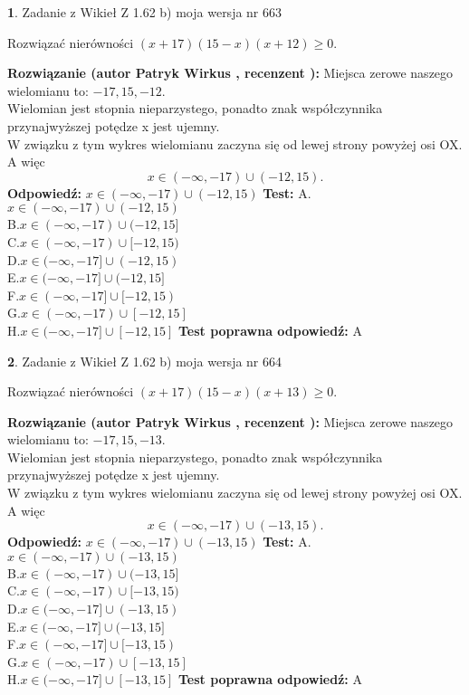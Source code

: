\documentclass[12pt, a4paper]{article}
\theoremstyle{definition} %
\newtheorem{zad}{}
\newcommand{\zadStart}[1]{\begin{zad}#1\newline}
\newcommand{\zadStop}{\end{zad}}
\newcommand{\rozwStart}[2]{\noindent \textbf{Rozwiązanie (autor #1 , recenzent #2): }\newline}
\newcommand{\rozwStop}{\newline}
\newcommand{\odpStart}{\noindent \textbf{Odpowiedź:}\newline}
\newcommand{\odpStop}{\newline}
\newcommand{\testStart}{\noindent \textbf{Test:}\newline}
\newcommand{\testStop}{\newline}
\newcommand{\kluczStart}{\noindent \textbf{Test poprawna odpowiedź:}\newline}
\newcommand{\kluczStop}{\newline}
\begin{document}
\zadStart{Zadanie z Wikieł Z 1.62 b) moja wersja nr 663}

Rozwiązać nierówności $(x+17)(15-x)(x+12)\ge0$.
\zadStop
\rozwStart{Patryk Wirkus}{}
Miejsca zerowe naszego wielomianu to: $-17, 15, -12$.\\
Wielomian jest stopnia nieparzystego, ponadto znak współczynnika przy\linebreak najwyższej potędze x jest ujemny.\\ W związku z tym wykres wielomianu zaczyna się od lewej strony powyżej osi OX. A więc $$x \in (-\infty,-17) \cup (-12,15).$$
\rozwStop
\odpStart
$x \in (-\infty,-17) \cup (-12,15)$
\odpStop
\testStart
A.$x \in (-\infty,-17) \cup (-12,15)$\\
B.$x \in (-\infty,-17) \cup (-12,15]$\\
C.$x \in (-\infty,-17) \cup [-12,15)$\\
D.$x \in (-\infty,-17] \cup (-12,15)$\\
E.$x \in (-\infty,-17] \cup (-12,15]$\\
F.$x \in (-\infty,-17] \cup [-12,15)$\\
G.$x \in (-\infty,-17) \cup [-12,15]$\\
H.$x \in (-\infty,-17] \cup [-12,15]$
\testStop
\kluczStart
A
\kluczStop



\zadStart{Zadanie z Wikieł Z 1.62 b) moja wersja nr 664}

Rozwiązać nierówności $(x+17)(15-x)(x+13)\ge0$.
\zadStop
\rozwStart{Patryk Wirkus}{}
Miejsca zerowe naszego wielomianu to: $-17, 15, -13$.\\
Wielomian jest stopnia nieparzystego, ponadto znak współczynnika przy\linebreak najwyższej potędze x jest ujemny.\\ W związku z tym wykres wielomianu zaczyna się od lewej strony powyżej osi OX. A więc $$x \in (-\infty,-17) \cup (-13,15).$$
\rozwStop
\odpStart
$x \in (-\infty,-17) \cup (-13,15)$
\odpStop
\testStart
A.$x \in (-\infty,-17) \cup (-13,15)$\\
B.$x \in (-\infty,-17) \cup (-13,15]$\\
C.$x \in (-\infty,-17) \cup [-13,15)$\\
D.$x \in (-\infty,-17] \cup (-13,15)$\\
E.$x \in (-\infty,-17] \cup (-13,15]$\\
F.$x \in (-\infty,-17] \cup [-13,15)$\\
G.$x \in (-\infty,-17) \cup [-13,15]$\\
H.$x \in (-\infty,-17] \cup [-13,15]$
\testStop
\kluczStart
A
\kluczStop
\end{document}
